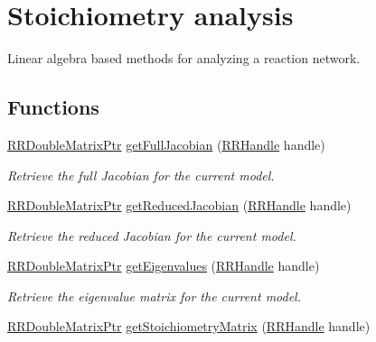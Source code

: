 \hypertarget{group___stoich}{\section{Stoichiometry analysis}
\label{group___stoich}
}


Linear algebra based methods for analyzing a reaction network.  


\subsection*{Functions}
\begin{DoxyCompactItemize}
\item 
\hyperlink{rrc__types_8h_ae586a879d30f0823087e42d93464b5dd}{R\+R\+Double\+Matrix\+Ptr} \hyperlink{group___stoich_ga88846978224863c431128cbd438c8e85}{get\+Full\+Jacobian} (\hyperlink{rrc__types_8h_a1d68f0592372208fa5a5f2799ea4b3ae}{R\+R\+Handle} handle)
\begin{DoxyCompactList}\small\item\em Retrieve the full Jacobian for the current model. \end{DoxyCompactList}\item 
\hyperlink{rrc__types_8h_ae586a879d30f0823087e42d93464b5dd}{R\+R\+Double\+Matrix\+Ptr} \hyperlink{group___stoich_ga1de0e1a27f15a1226b2a1bf1ce55fa7d}{get\+Reduced\+Jacobian} (\hyperlink{rrc__types_8h_a1d68f0592372208fa5a5f2799ea4b3ae}{R\+R\+Handle} handle)
\begin{DoxyCompactList}\small\item\em Retrieve the reduced Jacobian for the current model. \end{DoxyCompactList}\item 
\hyperlink{rrc__types_8h_ae586a879d30f0823087e42d93464b5dd}{R\+R\+Double\+Matrix\+Ptr} \hyperlink{group___stoich_gab8a67356f527fdc041058480189c7f68}{get\+Eigenvalues} (\hyperlink{rrc__types_8h_a1d68f0592372208fa5a5f2799ea4b3ae}{R\+R\+Handle} handle)
\begin{DoxyCompactList}\small\item\em Retrieve the eigenvalue matrix for the current model. \end{DoxyCompactList}\item 
\hyperlink{rrc__types_8h_ae586a879d30f0823087e42d93464b5dd}{R\+R\+Double\+Matrix\+Ptr} \hyperlink{group___stoich_ga9dfb0e092b1bf08be1be27e06faf6f63}{get\+Stoichiometry\+Matrix} (\hyperlink{rrc__types_8h_a1d68f0592372208fa5a5f2799ea4b3ae}{R\+R\+Handle} handle)

\end{DoxyCompactItemize}
